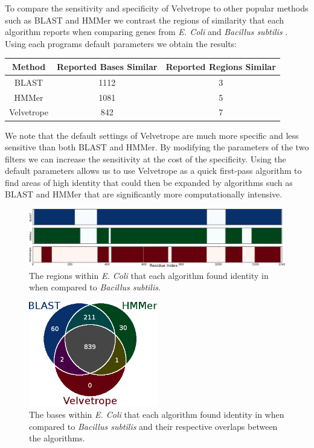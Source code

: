 \documentclass[phd,tocprelim]{cornell}
\begin{document}
To compare the sensitivity and specificity of Velvetrope to other popular methods such as BLAST \cite{BLAST} and HMMer \cite{Eddy98} we contrast the regions of similarity that each algorithm reports when comparing genes from {\it E. Coli} and {\it Bacillus subtilis} \cite{GenBank}. Using each programs default parameters we obtain the results:

\begin{table}[h]
    \begin{center}
\begin{tabular}{c|c|c}
    Method & Reported Bases Similar & Reported Regions Similar \\
    \hline
    BLAST & 1112 & 3 \\
    HMMer & 1081 & 5 \\
    Velvetrope & 842 & 7
\end{tabular}
\label{vr_comp_table}
\end{center}
\end{table}
We note that the default settings of Velvetrope are much more specific and less sensitive than both BLAST and HMMer. By modifying the parameters of the two filters we can increase the sensitivity at the cost of the specificity. Using the default parameters allows us to use Velvetrope as a quick first-pass algorithm to find areas of high identity that could then be expanded by algorithms such as BLAST and HMMer that are significantly more computationally intensive.

\begin{figure}[htp]%
 \centerline{\includegraphics[width=\textwidth]{figures/velvetrope/compare6.png}}
 \caption[Velvetrope vs. HMMer and BLAST]{The regions within {\it E. Coli} that each algorithm found identity in when compared to {\it Bacillus subtilis}.}
 	\label{VRcompare1}
 \end{figure}

 \begin{figure}[htp]%
 \centerline{\includegraphics[width=0.5\textwidth]{figures/velvetrope/compare5.png}}
 \caption[Comparison Venn diagram]{The bases within {\it E. Coli} that each algorithm found identity in when compared to {\it Bacillus subtilis} and their respective overlaps between the algorithms.}
 	\label{VRcompare2}
 \end{figure}
\end{document}
